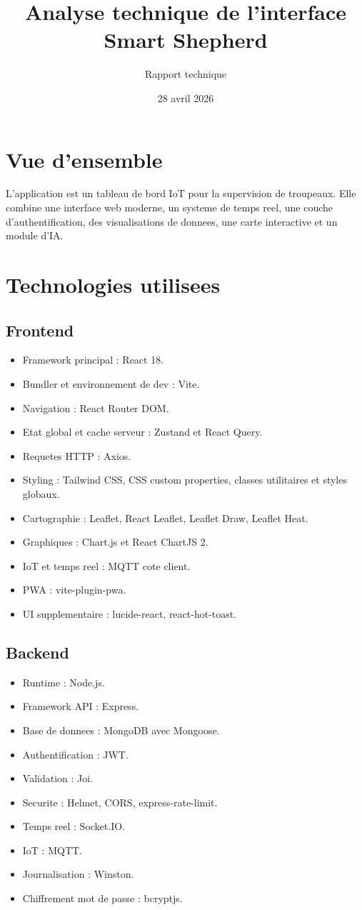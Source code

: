 \documentclass[11pt,a4paper]{article}
\title{Analyse technique de l'interface Smart Shepherd}
\author{Rapport technique}
\date{28 avril 2026}
\begin{document}
\maketitle

\section{Vue d'ensemble}
L'application est un tableau de bord IoT pour la supervision de troupeaux. Elle combine une interface web moderne, un systeme de temps reel, une couche d'authentification, des visualisations de donnees, une carte interactive et un module d'IA.

\section{Technologies utilisees}
\subsection{Frontend}
\begin{itemize}[leftmargin=1.2cm]
  \item Framework principal : React 18.
  \item Bundler et environnement de dev : Vite.
  \item Navigation : React Router DOM.
  \item Etat global et cache serveur : Zustand et React Query.
  \item Requetes HTTP : Axios.
  \item Styling : Tailwind CSS, CSS custom properties, classes utilitaires et styles globaux.
  \item Cartographie : Leaflet, React Leaflet, Leaflet Draw, Leaflet Heat.
  \item Graphiques : Chart.js et React ChartJS 2.
  \item IoT et temps reel : MQTT cote client.
  \item PWA : vite-plugin-pwa.
  \item UI supplementaire : lucide-react, react-hot-toast.
\end{itemize}

\subsection{Backend}
\begin{itemize}[leftmargin=1.2cm]
  \item Runtime : Node.js.
  \item Framework API : Express.
  \item Base de donnees : MongoDB avec Mongoose.
  \item Authentification : JWT.
  \item Validation : Joi.
  \item Securite : Helmet, CORS, express-rate-limit.
  \item Temps reel : Socket.IO.
  \item IoT : MQTT.
  \item Journalisation : Winston.
  \item Chiffrement mot de passe : bcryptjs.
\end{itemize}
\end{document}
